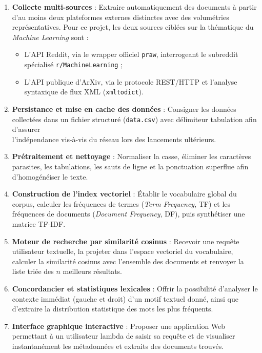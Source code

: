 \documentclass[12pt,a4paper]{article}
\begin{document}
\begin{enumerate}
    \item \textbf{Collecte multi-sources} : Extraire automatiquement des documents à partir d'au moins deux plateformes externes distinctes avec des volumétries représentatives. Pour ce projet, les deux sources ciblées sur la thématique du \textit{Machine Learning} sont :
        \begin{itemize}
            \item L'API Reddit, via le wrapper officiel \texttt{praw}, interrogeant le subreddit spécialisé \texttt{r/MachineLearning} ;
            \item L'API publique d'ArXiv, via le protocole REST/HTTP et l'analyse syntaxique de flux XML (\texttt{xmltodict}).
        \end{itemize}
    \item \textbf{Persistance et mise en cache des données} : Consigner les données collectées dans un fichier structuré (\texttt{data.csv}) avec délimiteur tabulation afin d'assurer \\l'indépendance vis-à-vis du réseau lors des lancements ultérieurs.
    \item \textbf{Prétraitement et nettoyage} : Normaliser la casse, éliminer les caractères parasites, les tabulations, les sauts de ligne et la ponctuation superflue afin d'homogénéiser le texte.
    \item \textbf{Construction de l'index vectoriel} : Établir le vocabulaire global du corpus, calculer les fréquences de termes (\textit{Term Frequency}, TF) et les fréquences de documents (\textit{Document Frequency}, DF), puis synthétiser une matrice TF-IDF.
    \item \textbf{Moteur de recherche par similarité cosinus} : Recevoir une requête utilisateur textuelle, la projeter dans l'espace vectoriel du vocabulaire, calculer la similarité cosinus avec l'ensemble des documents et renvoyer la liste triée des $n$ meilleurs résultats.
    \item \textbf{Concordancier et statistiques lexicales} : Offrir la possibilité d'analyser le contexte immédiat (gauche et droit) d'un motif textuel donné, ainsi que d'extraire la distribution statistique des mots les plus fréquents.
    \item \textbf{Interface graphique interactive} : Proposer une application Web permettant à un utilisateur lambda de saisir sa requête et de visualiser instantanément les métadonnées et extraits des documents trouvés.
\end{enumerate}
\end{document}
